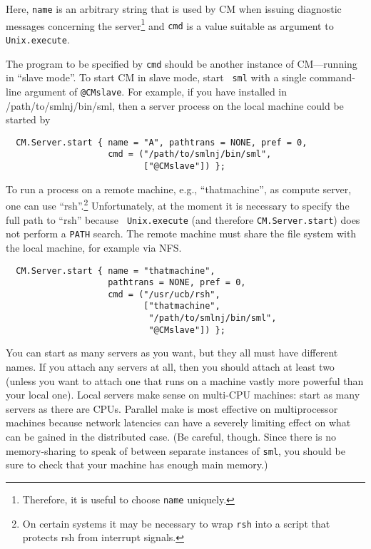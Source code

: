 \documentclass[titlepage,letterpaper]{article}
\begin{document}
Here, {\tt name} is an arbitrary string that is used by CM when
issuing diagnostic messages concerning the server\footnote{Therefore,
it is useful to choose {\tt name} uniquely.} and {\tt cmd} is a value
suitable as argument to {\tt Unix.execute}.

The program to be specified by {\tt cmd} should be another instance of
CM---running in ``slave mode''.  To start CM in slave mode, start {\tt
sml} with a single command-line argument of {\tt @CMslave}.  For
example, if you have installed in /path/to/smlnj/bin/sml, then a
server process on the local machine could be started by

\begin{verbatim}
  CM.Server.start { name = "A", pathtrans = NONE, pref = 0,
                    cmd = ("/path/to/smlnj/bin/sml",
                           ["@CMslave"]) };
\end{verbatim}

To run a process on a remote machine, e.g., ``thatmachine'', as
compute server, one can use ``rsh''.\footnote{On certain systems it
may be necessary to wrap {\tt rsh} into a script that protects rsh
from interrupt signals.}  Unfortunately, at the moment it
is necessary to specify the full path to ``rsh'' because {\tt
Unix.execute} (and therefore {\tt CM.Server.start}) does not perform
a {\tt PATH} search. The remote machine
must share the file system with the local machine, for example via NFS.

\begin{verbatim}
  CM.Server.start { name = "thatmachine",
                    pathtrans = NONE, pref = 0,
                    cmd = ("/usr/ucb/rsh",
                           ["thatmachine",
                            "/path/to/smlnj/bin/sml",
                            "@CMslave"]) };
\end{verbatim}

You can start as many servers as you want, but they all must have
different names.  If you attach any servers at all, then you should
attach at least two (unless you want to attach one that runs on a
machine vastly more powerful than your local one).  Local servers make
sense on multi-CPU machines: start as many servers as there are CPUs.
Parallel make is most effective on multiprocessor machines because
network latencies can have a severely limiting effect on what can be
gained in the distributed case.
(Be careful, though.  Since there is no memory-sharing to speak of
between separate instances of {\tt sml}, you should be sure to check
that your machine has enough main memory.)
\end{document}
